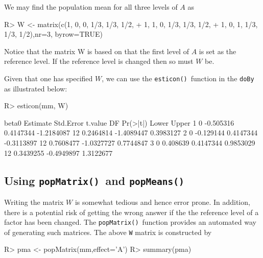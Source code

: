 \documentclass[11pt]{article}
\def\code#1{\texttt{#1}}
\def\popmeans{\code{popMeans()}}
\def\popmatrix{\code{popMatrix()}}
\def\esticon{\code{esticon()}}
\begin{document}
We may find the population mean for all three levels of $A$ as
\begin{Schunk}
\begin{Sinput}
R> W <- matrix(c(1, 0, 0, 1/3, 1/3, 1/2,
+                1, 1, 0, 1/3, 1/3, 1/2,
+                1, 0, 1, 1/3, 1/3, 1/2),nr=3, byrow=TRUE)
\end{Sinput}
\end{Schunk}

Notice that the matrix W is based on that the first level of $A$ is
set as the reference level. If the reference level is changed then so
must $W$ be.


Given that one has specified $W$, we can use the \esticon\ function in the
\code{doBy} as illustrated below:

\begin{Schunk}
\begin{Sinput}
R> esticon(mm, W)
\end{Sinput}
\begin{Soutput}
  beta0  Estimate Std.Error    t.value DF  Pr(>|t|)      Lower     Upper
1     0 -0.505316 0.4147344 -1.2184087 12 0.2464814 -1.4089447 0.3983127
2     0 -0.129144 0.4147344 -0.3113897 12 0.7608477 -1.0327727 0.7744847
3     0  0.408639 0.4147344  0.9853029 12 0.3439255 -0.4949897 1.3122677
\end{Soutput}
\end{Schunk}

\subsection{Using \popmatrix\  and \popmeans}
\label{sec:xxx}

Writing the matrix $W$ is somewhat tedious and hence error prone. In
addition, there is a potential risk of getting the wrong answer if the
the reference level of a factor has been changed.
The \popmatrix\ function provides an automated way of generating
such matrices.
The above \verb+W+ matrix is  constructed by
\begin{Schunk}
\begin{Sinput}
R> pma <- popMatrix(mm,effect='A')
R> summary(pma)
\end{Sinput}
\end{Schunk}
\end{document}
